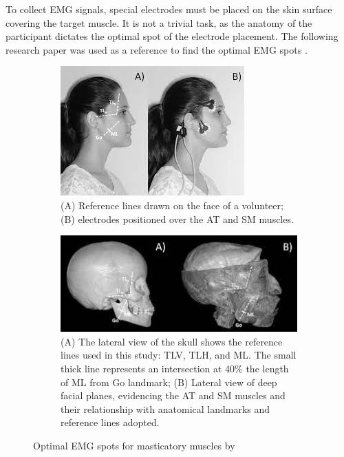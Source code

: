 To collect EMG signals, special electrodes must be placed on the skin surface covering the target muscle. It is not a trivial task, as the anatomy of the participant dictates the optimal spot of the electrode placement. The following research paper was used as a reference to find the optimal EMG spots \cite{sabaneeff2017proposal}.

\begin{figure}[h!]
\centering
 \begin{subfigure}[b]{0.49\textwidth}
    \includegraphics[width=\textwidth]{src/media/study/emg1.jpeg}
    \caption{ (A) Reference lines drawn on the face of a volunteer;
(B) electrodes positioned over the AT and SM muscles. \cite{sabaneeff2017proposal}}
  \end{subfigure}
 \hfill
 \begin{subfigure}[b]{0.49\textwidth}
    \includegraphics[width=\textwidth]{src/media/study/emg2.jpeg}
    \caption{ (A) The lateral view of the skull shows the reference lines used
in this study: TLV, TLH, and ML. The small thick line represents an
intersection at 40\% the length of ML from Go landmark; (B) Lateral
view of deep facial planes, evidencing the AT and SM muscles and their
relationship with anatomical landmarks and reference lines adopted. \cite{sabaneeff2017proposal}}
  \end{subfigure}
\caption{Optimal EMG spots for masticatory muscles by \cite{sabaneeff2017proposal}}
\label{image:real-emg}
\end{figure}

